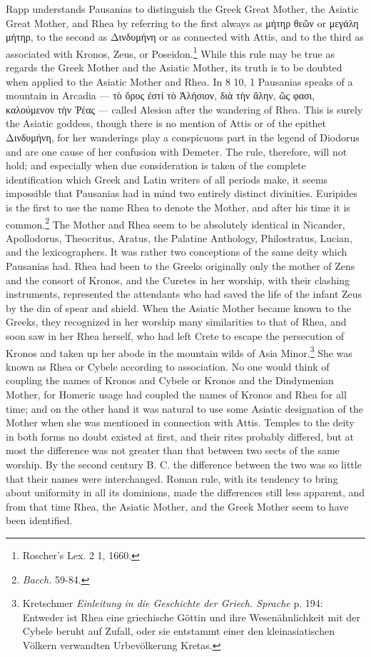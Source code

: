 \documentclass[a4paper, 11pt, oneside, polutonikogreek, english]{article}
\begin{document}
Rapp understands Pausanias to distinguish the Greek Great Mother, the Asiatic Great Mother, and Rhea by referring to the first always as μήτηρ θεῶν or μεγάλη μήτηρ, to the second as Δινδυμήνη or as connected with Attis, and to the third as associated with Kronos, Zeus, or Poseidon.\footnote{Roscher's Lex. 2 1, 1660.} While this rule may be true as regards the Greek Mother and the Asiatic Mother, its truth is to be doubted when applied to the Asiatic Mother and Rhea. In 8 10, 1 Pausanias speaks of a mountain in Arcadia --- τὸ ὄρος ἐστὶ τὸ Ἀλήσιον, διὰ τὴν ἄλην, ὥς φασι, καλούμενον τὴν Ῥέας --- called Alesion after the wandering of Rhea. This is surely the Asiatic goddess, though there is no mention of Attis or of the epithet Δινδυμήνη, for her wanderings play a conspicuous part in the legend of Diodorus and are one cause of her confusion with Demeter. The rule, therefore, will not hold; and especially when due consideration is taken of the complete identification which Greek and Latin writers of all periods make, it seems impossible that Pausanias had in mind two entirely distinct divinities. Euripides is the first to use the name Rhea to denote the Mother, and after his time it is common.\footnote{\emph{Bacch.} 59-84.} The Mother and Rhea seem to be absolutely identical in Nicander, Apollodorus, Theocritus, Aratus, the Palatine Anthology, Philostratus, Lucian, and the lexicographers. It was rather two conceptions of the same deity which Pausanias had. Rhea had been to the Greeks originally only the mother of Zens and the consort of Kronos, and the Curetes in her worship, with their clashing instruments, represented the attendants who had saved the life of the infant Zeus by the din of spear and shield. When the Asiatic Mother became known to the Greeks, they recognized in her worship many similarities to that of Rhea, and soon saw in her Rhea herself, who had left Crete to escape the persecution of Kronos and taken up her abode in the mountain wilds of Asia Minor.\footnote{Kretschmer \emph{Einleitung in die Geschichte der Griech. Sprache} p. 194: Entweder ist Rhea eine griechische Göttin und ihre Wesenähnlichkeit mit der Cybele beruht auf Zufall, oder sie entstammt einer den kleinasiatischen Völkern verwandten Urbevölkerung Kretas.} She was known as Rhea or Cybele according to association. No one would think of coupling the names of Kronos and Cybele or Kronos and the Dindymenian Mother, for Homeric usage had coupled the names of Kronos and Rhea for all time; and on the other hand it was natural to use some Asiatic designation of the Mother when she was mentioned in connection with Attis. Temples to the deity in both forms no doubt existed at first, and their rites probably differed, but at most the difference was not greater than that between two sects of the same worship. By the second century B. C. the difference between the two was so little that their names were interchanged. Roman rule, with its tendency to bring about uniformity in all its dominions, made the differences still less apparent, and from that time Rhea, the Asiatic Mother, and the Greek Mother seem to have been identified.
\clearpage
\end{document}
